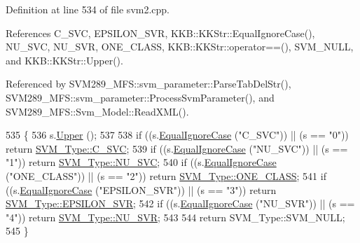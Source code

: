 Definition at line 534 of file svm2.\+cpp.



References C\+\_\+\+S\+VC, E\+P\+S\+I\+L\+O\+N\+\_\+\+S\+VR, K\+K\+B\+::\+K\+K\+Str\+::\+Equal\+Ignore\+Case(), N\+U\+\_\+\+S\+VC, N\+U\+\_\+\+S\+VR, O\+N\+E\+\_\+\+C\+L\+A\+SS, K\+K\+B\+::\+K\+K\+Str\+::operator==(), S\+V\+M\+\_\+\+N\+U\+LL, and K\+K\+B\+::\+K\+K\+Str\+::\+Upper().



Referenced by S\+V\+M289\+\_\+\+M\+F\+S\+::svm\+\_\+parameter\+::\+Parse\+Tab\+Del\+Str(), S\+V\+M289\+\_\+\+M\+F\+S\+::svm\+\_\+parameter\+::\+Process\+Svm\+Parameter(), and S\+V\+M289\+\_\+\+M\+F\+S\+::\+Svm\+\_\+\+Model\+::\+Read\+X\+M\+L().


\begin{DoxyCode}
535 \{
536   s.\hyperlink{class_k_k_b_1_1_k_k_str_a66ea0feabc94da88591b56a683695bd9}{Upper} ();
537 
538   \textcolor{keywordflow}{if}  ((s.\hyperlink{class_k_k_b_1_1_k_k_str_a562f9696417c53f66bc4088eac072ab5}{EqualIgnoreCase} (\textcolor{stringliteral}{"C\_SVC"}))        ||  (s == \textcolor{stringliteral}{"0"}))  \textcolor{keywordflow}{return} 
      \hyperlink{namespace_s_v_m233_acde4c278f323c82a6b41c27f6f30738aa942f03bda3ae7dbb9e945f161c95ab97}{SVM\_Type::C\_SVC};
539   \textcolor{keywordflow}{if}  ((s.\hyperlink{class_k_k_b_1_1_k_k_str_a562f9696417c53f66bc4088eac072ab5}{EqualIgnoreCase} (\textcolor{stringliteral}{"NU\_SVC"}))       ||  (s == \textcolor{stringliteral}{"1"}))  \textcolor{keywordflow}{return} 
      \hyperlink{namespace_s_v_m233_acde4c278f323c82a6b41c27f6f30738aa7705bf71b9d3c7169b4d201acb2b30b8}{SVM\_Type::NU\_SVC};
540   \textcolor{keywordflow}{if}  ((s.\hyperlink{class_k_k_b_1_1_k_k_str_a562f9696417c53f66bc4088eac072ab5}{EqualIgnoreCase} (\textcolor{stringliteral}{"ONE\_CLASS"}))    ||  (s == \textcolor{stringliteral}{"2"}))  \textcolor{keywordflow}{return}  
      \hyperlink{namespace_s_v_m233_acde4c278f323c82a6b41c27f6f30738aaea64d54fb16ebcd95d48c4aef97036df}{SVM\_Type::ONE\_CLASS};
541   \textcolor{keywordflow}{if}  ((s.\hyperlink{class_k_k_b_1_1_k_k_str_a562f9696417c53f66bc4088eac072ab5}{EqualIgnoreCase} (\textcolor{stringliteral}{"EPSILON\_SVR"}))  ||  (s == \textcolor{stringliteral}{"3"}))  \textcolor{keywordflow}{return}  
      \hyperlink{namespace_s_v_m233_acde4c278f323c82a6b41c27f6f30738aae7f29e93ef95067dcc6827e4fe3071c7}{SVM\_Type::EPSILON\_SVR};
542   \textcolor{keywordflow}{if}  ((s.\hyperlink{class_k_k_b_1_1_k_k_str_a562f9696417c53f66bc4088eac072ab5}{EqualIgnoreCase} (\textcolor{stringliteral}{"NU\_SVR"}))       ||  (s == \textcolor{stringliteral}{"4"}))  \textcolor{keywordflow}{return}  
      \hyperlink{namespace_s_v_m233_acde4c278f323c82a6b41c27f6f30738aaa9c624ae638f160fb1f00081960014b6}{SVM\_Type::NU\_SVR};
543 
544   \textcolor{keywordflow}{return}  SVM\_Type::SVM\_NULL;
545 \}
\end{DoxyCode}

